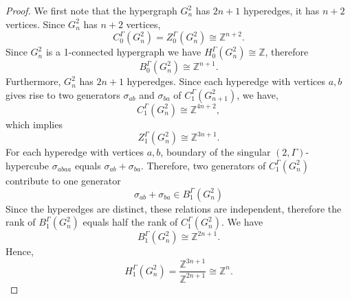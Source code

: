 \documentclass[10pt,a4paper]{amsart}
\begin{document}
\begin{proof}   We first note that the hypergraph $G_n^2$ has    $2n+1$ hyperedges, it has $n+2$ vertices. Since $G_{n}^2$ has $n+2$ vertices, 
    \[C_0^\Gamma(G_{n}^2)=Z_0^\Gamma(G_{n}^2)\cong \mathbb{Z}^{n+2}. \] 
    Since $G_{n}^2$  is a 1-connected hypergraph we have $H_0^\Gamma(G_{n}^2)\cong\mathbb{Z}$, 
    therefore
            \[ B_0^\Gamma(G_{n}^2)\cong \mathbb{Z}^{n+1}.
           \]
           Furthermore, $G_{n}^2$ has $2n+1$  hyperedges. 
           Since each
hyperedge with vertices $a,b$ gives rise to two generators
$\sigma_{ab}$ and $\sigma_{ba}$ of $C_1^\Gamma(G_{n+1}^2)$, we have,
           \[ C_1^\Gamma(G_{n}^2)\cong \mathbb{Z}^{4n+2}, \] which implies \[Z_1^\Gamma(G_{n}^2)\cong \mathbb{Z}^{3n+1}.\] 
           For each hyperedge with vertices $a,b$, boundary of the singular $(2,\Gamma)$-hypercube $\sigma_{abaa}$ equals $\sigma_{ab}+\sigma_{ba}$. 
           Therefore, two generators of 
           $C_1^\Gamma(G_{n}^2)$
           contribute to one generator
           \[
           \sigma_{ab}+\sigma_{ba}\in B_1^
           \Gamma(G_{n}^2)\]
           Since the hyperedges are distinct, these
relations are independent,
           therefore the rank of
           $B_1^\Gamma(G_{n}^2)$ equals half the rank of $C_1^\Gamma(G_{n}^2)$. 
           We have \[  B_1^\Gamma(G_{n}^2)\cong \mathbb{Z}^{2n+1}.\]  
           Hence, \[H_1^\Gamma(G_{n}^2)=\frac{\mathbb{Z}^{3n+1}}{\mathbb{Z}^{2n+1}}\cong \mathbb{Z}^{n}.\]
           
           

\end{proof}
\end{document}
